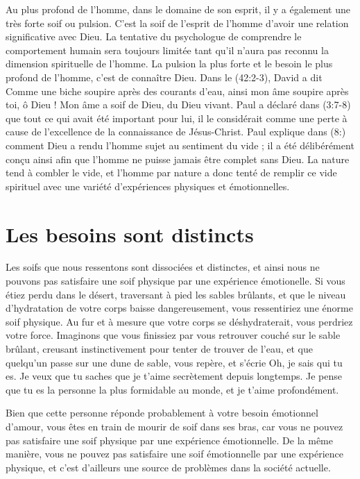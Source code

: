 Au plus profond de l'homme, dans le domaine de son esprit,
 il y a également une très forte soif ou pulsion.
 C'est la soif de l'esprit de l'homme d'avoir une relation significative avec Dieu.
 La tentative du psychologue de comprendre le comportement humain sera toujours
 limitée tant qu'il n'aura pas reconnu la dimension spirituelle de l'homme.
 La pulsion la plus forte et le besoin le plus profond de l'homme, c'est de connaître Dieu.
 Dans le (42:2-3), David a dit\frcolon{}
 \Og Comme une biche soupire après des courants d'eau,
 ainsi mon âme soupire après toi, ô Dieu !
 Mon âme a soif de Dieu, du Dieu vivant. \Fg{}
 Paul a déclaré dans (3:7-8) que tout ce qui avait été
 important pour lui, il le considérait comme une perte à cause
 de l'excellence de la connaissance de Jésus-Christ.
 Paul explique dans (8:) comment Dieu a rendu l'homme
 sujet au sentiment du vide ; il a été délibérément conçu ainsi afin que l'homme
 ne puisse jamais être complet sans Dieu.
 La nature tend à combler le vide, et l'homme par nature a donc tenté
 de remplir ce vide spirituel avec une variété d'expériences 
 physiques et émotionnelles.


\section{Les besoins sont distincts}

Les soifs que nous ressentons sont dissociées et distinctes,
 et ainsi nous ne pouvons pas satisfaire une soif physique
 par une expérience émotionelle. Si vous étiez perdu dans le désert,
 traversant à pied les sables brûlants, et que le niveau d'hydratation
 de votre corps baisse dangereusement, vous ressentiriez une énorme soif
 physique. Au fur et à mesure que votre corps se déshydraterait,
 vous perdriez votre force. Imaginons que vous finissiez par vous
 retrouver couché sur le sable brûlant, creusant instinctivement
 pour tenter de trouver de l'eau, et que quelqu'un passe sur une dune
 de sable, vous repère, et s'écrie\frcolon{}
 \Og Oh, je sais qui tu es. Je veux que tu saches que je t'aime secrètement depuis longtemps.
 Je pense que tu es la personne la plus formidable au monde,
 et je t'aime profondément. \Fg{}


Bien que cette personne réponde probablement à votre besoin émotionnel
 d'amour, vous êtes en train de mourir de soif dans ses bras,
 car vous ne pouvez pas satisfaire une soif physique par une
 expérience émotionnelle. De la même manière, vous ne pouvez pas satisfaire une soif
 émotionnelle par une expérience physique,
 et c'est d'ailleurs une source de problèmes dans la société actuelle.


